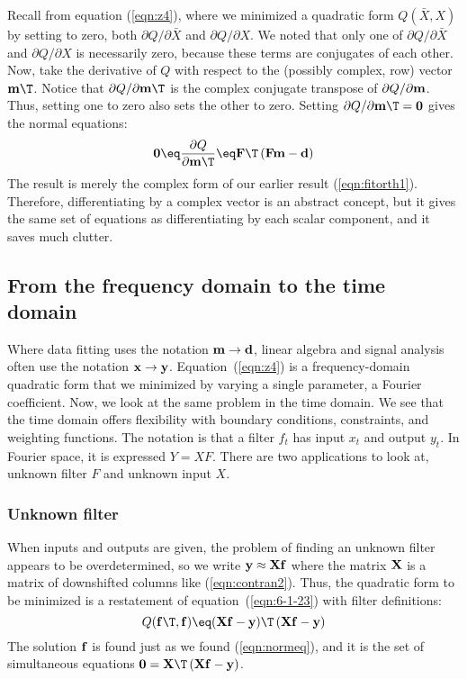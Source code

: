 Recall from equation (\ref{eqn:z4}), where
we minimized a quadratic form $Q(\bar X,X)$
by setting to zero, both
$\partial Q/\partial \bar X$ and $\partial Q/\partial X$.
We noted that only one of
$\partial Q/\partial \bar X$ and $\partial Q/\partial X$
is necessarily zero,
because these terms are conjugates of each other.
Now, take the derivative of $Q$
with respect to the (possibly complex, row) vector $\bold m\T$.
Notice that $\partial Q/\partial  \bold m\T$ is the complex conjugate transpose
of $\partial Q/\partial  \bold m$.
Thus, setting one to zero also sets the other to zero.
Setting $\partial Q/\partial \bold m\T =\bold 0$ gives the normal equations:
\begin{equation}
\bold 0 \eq \frac{\partial Q}{\partial \bold m\T} \eq
\bold F\T\,(\bold F \bold m - \bold d)
\label{eqn:normeq}
\end{equation}
The result is merely the complex form of
our earlier result (\ref{eqn:fitorth1}).
Therefore,
differentiating by a complex vector
is an abstract concept,
but it gives the same set of equations
as differentiating by each scalar component,
and it saves much clutter.

\subsection{From the frequency domain to the time domain}
Where data fitting uses
the notation $\bold m \rightarrow \bold d$,
linear algebra and signal analysis often use
the notation $\bold x \rightarrow \bold y$.
Equation~(\ref{eqn:z4}) is a frequency-domain quadratic form
that we minimized by varying a single parameter,
a Fourier coefficient.
Now, we look at the same problem in the time domain.
We see that the time domain offers flexibility with
boundary conditions, constraints, and weighting functions.
The notation is that a filter $f_t$ has input $x_t$ and output $y_t$.
In Fourier space, it is expressed $Y=XF$.
There are two applications to look at,
unknown filter $F$ and unknown input $X$.

\subsubsection{Unknown filter}
When inputs and outputs are given,
the problem of finding an unknown filter appears to be overdetermined,
so we write $\bold y \approx \bold X \bold f$
where the matrix $\bold X$ is a matrix of downshifted columns like
(\ref{eqn:contran2}).
Thus, the quadratic form to be minimized
is a restatement of equation~(\ref{eqn:6-1-23})
with filter definitions:
\begin{equation}
Q(\bold f\T, \bold f) \eq
(\bold X\bold f - \bold y)\T\,
(\bold X\bold f - \bold y)
\end{equation}
The solution $\bold f$ is found just as we found
(\ref{eqn:normeq}),
and it is the set of simultaneous equations
$ \bold 0 = \bold X\T\,(\bold X\bold f - \bold y)$.

